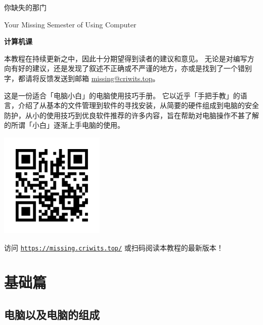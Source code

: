 \documentclass[a4paper,x11names]{book}
\date{\today}
\begin{document}
\maketitle

\frontmatter

\thispagestyle{empty}
\begin{center}
  \vspace*{2.5cm}
  \fontsize{42pt}{54pt}\selectfont{}\textsf{你缺失的那门}\par
  \fontsize{18pt}{18pt}\selectfont{}\textsf{Your Missing Semester of Using Computer}\par
  \fontsize{54pt}{8pt}\selectfont{}\textbf{\textsf{计算机课}}\par
  \vspace*{3.6cm}
\end{center}

\begin{note}
  本教程在持续更新之中，因此十分期望得到读者的建议和意见。
  无论是对编写方向有好的建议，还是发现了叙述不正确或不严谨的地方，亦或是找到了一个错别字，都请将反馈发送到邮箱 \href{mailto:missing@criwits.top}{missing@criwits.top}。
\end{note}

这是一份适合「电脑小白」的电脑使用技巧手册。
它以近乎「手把手教」的语言，介绍了从基本的文件管理到软件的寻找安装，从简要的硬件组成到电脑的安全防护，从小的使用技巧到优良软件推荐的许多内容，旨在帮助对电脑操作不甚了解的所谓「小白」逐渐上手电脑的使用。

\begin{center}
  \vspace*{1cm}
  \includegraphics[width=5cm]{assets/QR_CODE.png}\par
  访问 \href{https://missing.criwits.top/}{\texttt{https://missing.criwits.top/}} 或扫码阅读本教程的最新版本！\par
\end{center}  

\renewcommand\thefootnote{\fnsymbol{footnote}}
\tableofcontents
\renewcommand\thefootnote{\arabic{footnote}}



\mainmatter



\part{基础篇}

\chapter{电脑以及电脑的组成}
\end{document}
